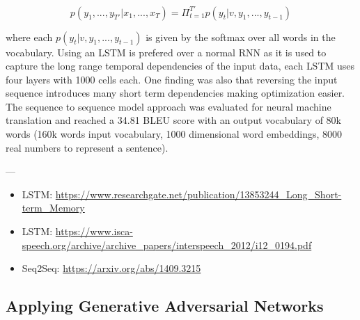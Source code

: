 \begin{equation}
	p(y_1, ..., y_{T'} | x_1, ..., x_{T}) = \Pi_{t=1}^{T'} p(y_t | v, y_1, ..., y_{t-1})
\end{equation}

where each $p(y_t | v, y_1, ..., y_{t-1})$ is given by the softmax over all words in the vocabulary. Using an \ac{LSTM} is prefered over a normal \ac{RNN} as it is used to capture the long range temporal dependencies of the input data, each \ac{LSTM} uses four layers with 1000 cells each. One finding was also that reversing the input sequence introduces many short term dependencies making optimization easier. The sequence to sequence model approach was evaluated for neural machine translation and reached a 34.81 BLEU score with an output vocabulary of 80k words (160k words input vocabulary, 1000 dimensional word embeddings, 8000 real numbers to represent a sentence). 


---

\begin{itemize}
	\item LSTM: \url{https://www.researchgate.net/publication/13853244_Long_Short-term_Memory}
	\item LSTM: \url{https://www.isca-speech.org/archive/archive_papers/interspeech_2012/i12_0194.pdf}
	\item Seq2Seq: \url{https://arxiv.org/abs/1409.3215}
\end{itemize}


\subsection{Applying Generative Adversarial Networks} \label{fundamentalsF}

